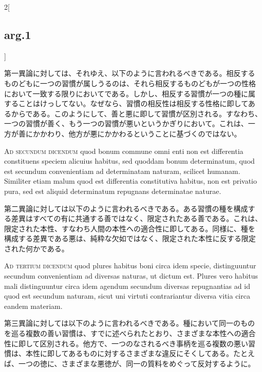 \documentclass[paper=a4paper,fontsize=10pt,jafontsize=9pt,titlepage]{jlreq}
\begin{document}
\begin{paracol}{2}[\subsection{arg.1}]
\switchcolumn

第一異論に対しては、それゆえ、以下のように言われるべきである。相反する
ものどもに一つの習慣が属しうるのは、それら相反するものどもが一つの性格
において一致する限りにおいてである。しかし、相反する習慣が一つの種に属
することはけっしてない。なぜなら、習慣の相反性は相反する性格に即してあ
るからである。このようにして、善と悪に即して習慣が区別される。すなわち、
一つの習慣が善く、もう一つの習慣が悪いというかぎりにおいて。これは、一
方が善にかかわり、他方が悪にかかわるということに基づくのではない。

\switchcolumn*[\subsection{ad.2}]

{\scshape Ad secundum dicendum} quod bonum commune omni enti non est
differentia constituens speciem alicuius habitus, sed quoddam bonum
determinatum, quod est secundum convenientiam ad determinatam naturam,
scilicet humanam. Similiter etiam malum quod est differentia
constitutiva habitus, non est privatio pura, sed est aliquid
determinatum repugnans determinatae naturae.

\switchcolumn

第二異論に対しては以下のように言われるべきである。ある習慣の種を構成す
る差異はすべての有に共通する善ではなく、限定されたある善である。これは、
限定された本性、すなわち人間の本性への適合性に即してある。同様に、種を
構成する差異である悪は、純粋な欠如ではなく、限定された本性に反する限定
された何かである。

\switchcolumn*[\subsection{ad.3}]

{\scshape Ad tertium dicendum} quod plures habitus boni circa idem
specie, distinguuntur secundum convenientiam ad diversas naturas, ut
dictum est. Plures vero habitus mali distinguuntur circa idem agendum
secundum diversas repugnantias ad id quod est secundum naturam, sicut
uni virtuti contrariantur diversa vitia circa eandem materiam.

\switchcolumn

第三異論に対しては以下のように言われるべきである。種において同一のもの
を巡る複数の善い習慣は、すでに述べられたとおり、さまざまな本性への適合
性に即して区別される。他方で、一つのなされるべき事柄を巡る複数の悪い習
慣は、本性に即してあるものに対するさまざまな違反にそくしてある。たとえ
ば、一つの徳に、さまざまな悪徳が、同一の質料をめぐって反対するように。

\end{paracol}
\newpage
{}
{}
\setcounter{section}{4}
\setcounter{subsection}{0}
\end{document}
